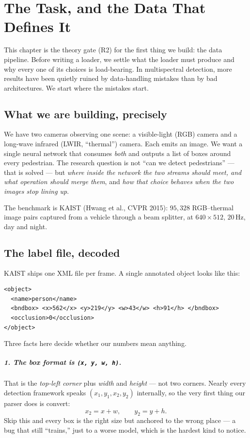 \documentclass[../main.tex]{subfiles}
\begin{document}
\chapter{The Task, and the Data That Defines It}

This chapter is the theory gate (R2) for the first thing we build: the data pipeline.
Before writing a loader, we settle what the loader must produce and why every one of its
choices is load-bearing. In multispectral detection, more results have been quietly ruined
by data-handling mistakes than by bad architectures. We start where the mistakes start.

\section{What we are building, precisely}

We have two cameras observing one scene: a visible-light (RGB) camera and a long-wave
infrared (LWIR, ``thermal'') camera. Each emits an image. We want a single neural network
that consumes \emph{both} and outputs a list of boxes around every pedestrian. The research
question is not ``can we detect pedestrians'' --- that is solved --- but \emph{where inside
the network the two streams should meet, and what operation should merge them}, and
\emph{how that choice behaves when the two images stop lining up}.

The benchmark is KAIST (Hwang et al., CVPR 2015): $95{,}328$ RGB--thermal image pairs
captured from a vehicle through a beam splitter, at $640\times512$, $20$\,Hz, day and night.

\section{The label file, decoded}

KAIST ships one XML file per frame. A single annotated object looks like this:

\begin{lstlisting}
<object>
  <name>person</name>
  <bndbox> <x>562</x> <y>219</y> <w>43</w> <h>91</h> </bndbox>
  <occlusion>0</occlusion>
</object>
\end{lstlisting}

Three facts here decide whether our numbers mean anything.

\paragraph{1. The box format is \texttt{(x, y, w, h)}.} That is the \emph{top-left corner}
plus \emph{width} and \emph{height} --- not two corners. Nearly every detection framework
speaks $(x_1,y_1,x_2,y_2)$ internally, so the very first thing our parser does is convert:
\[
  x_2 = x + w, \qquad y_2 = y + h.
\]
Skip this and every box is the right size but anchored to the wrong place --- a bug that
still ``trains,'' just to a worse model, which is the hardest kind to notice.
\end{document}
